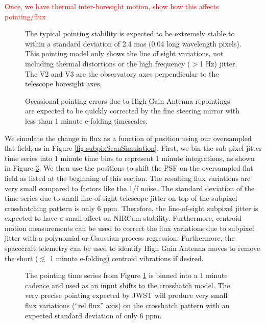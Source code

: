\documentclass[]{aastex62}
\begin{document}
\textcolor{red}{Once, we have thermal inter-boresight motion, show how this affects pointing/flux}

\begin{figure}
\caption{The typical pointing stability is expected to be extremely stable to within a standard deviation of 2.4 mas (0.04 long wavelength pixels).
This pointing model only shows the line of sight variations, not including thermal distortions or the high frequency ($>$1 Hz) jitter.
The V2 and V3 are the observatory axes perpendicular to the telescope boresight axes.
}\label{fig:tserPointingFull}
\end{figure}

\begin{figure}
\caption{Occasional pointing errors due to High Gain Antenna repointings are expected to be quickly corrected by the fine steering mirror with less than 1 minute e-folding timescales.
}\label{fig:tserPointingZoom}
\end{figure}

We simulate the change in flux as a function of position using our oversampled flat field, as in Figure \ref{fig:subpixScanSimulation}.
First, we bin the sub-pixel jitter time series into 1 minute time bins to represent 1 minute integrations, as shown in Figure \ref{fig:tserPointingAndFlux}.
We then use the positions to shift the PSF on the oversampled flat field as listed at the beginning of this section.
The resulting flux variations are very small compared to factors like the 1/f noise.
The standard deviation of the time series due to small line-of-sight telescope jitter on top of the subpixel crosshatching pattern is only 6 ppm.
Therefore, the line-of-sight subpixel jitter is expected to have a small affect on NIRCam stability.
Furthermore, centroid motion measurements can be used to correct the flux variations due to subpixel jitter with a polynomial or Gaussian process regression.
Furthermore, the spacecraft telemetry can be used to identify High Gain Antenna moves to remove the short ($\lesssim$ 1 minute e-folding) centroid vibrations if desired.

\begin{figure}
\caption{The pointing time series from Figure \ref{fig:tserPointingFull} is binned into a 1 minute cadence and used as an input shifts to the crosshatch model.
The very precise pointing expected by JWST will produce very small flux variations (``rel flux'' axis) on the crosshatch pattern with an expected standard deviation of only 6 ppm.
}\label{fig:tserPointingAndFlux}
\end{figure}
\end{document}
